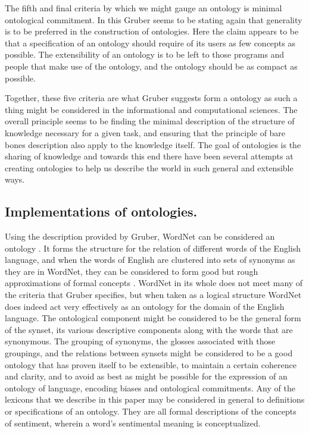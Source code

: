 \documentclass[letterpaper, 10 pt, conference]{ieeeconf}
\begin{document}
The fifth and final criteria by which we might gauge an ontology is minimal ontological commitment. In this Gruber seems to be stating again that generality is to be preferred in the construction of ontologies. Here the claim appears to be that a specification of an ontology should require of its users as few concepts as possible. The extensibility of an ontology is to be left to those programs and people that make use of the ontology, and the ontology should be as compact as possible.

Together, these five criteria are what Gruber suggests form a ontology as such a thing might be considered in the informational and computational sciences. The overall principle seems to be finding the minimal description of the structure of knowledge necessary for a given task, and ensuring that the principle of bare bones description also apply to the knowledge itself. The goal of ontologies is the sharing of knowledge and towards this end there have been several attempts at creating ontologies to help us describe the world in such general and extensible ways.

\subsection{Implementations of ontologies.}
Using the description provided by Gruber, WordNet can be considered an ontology \textcolor{gray}{\cite{WordNet}}. It forms the structure for the relation of different words of the English language, and when the words of English are clustered into sets of synonyms as they are in WordNet, they can be considered to form good but rough approximations of formal concepts \textcolor{gray}{\cite{Strapparava}}. WordNet in its whole does not meet many of the criteria that Gruber specifies, but when taken as a logical structure WordNet does indeed act very effectively as an ontology for the domain of the English language. The ontological component might be considered to be the general form of the synset, its various descriptive components along with the words that are synonymous. The grouping of synonyms, the glosses associated with those groupings, and the relations between synsets might be considered to be a good ontology that has proven itself to be extensible, to maintain a certain coherence and clarity, and to avoid as best as might be possible for the expression of an ontology of language, encoding biases and ontological commitments. Any of the lexicons that we describe in this paper may be considered in general to definitions or specifications of an ontology. They are all formal descriptions of the concepts of sentiment, wherein a word's sentimental meaning is conceptualized.
\end{document}
